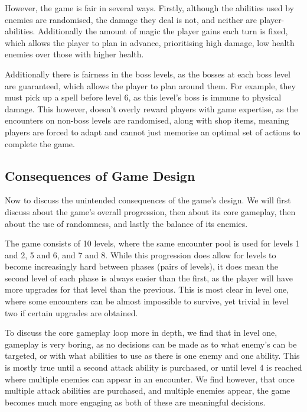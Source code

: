 However, the game is fair in several ways. Firstly, although the abilities used by enemies are randomised, the damage they deal is not, and neither are player-abilities. Additionally the amount of magic the player gains each turn is fixed, which allows the player to plan in advance, prioritising high damage, low health enemies over those with higher health. 

Additionally there is fairness in the boss levels, as the bosses at each boss level are guaranteed, which allows the player to plan around them. For example, they must pick up a spell before level 6, as this level's boss is immune to physical damage. This however, doesn't overly reward players with game expertise, as the encounters on non-boss levels are randomised, along with shop items, meaning players are forced to adapt and cannot just memorise an optimal set of actions to complete the game. 

\subsection{Consequences of Game Design}


Now to discuss the unintended consequences of the game's design. We will first discuss about the game's overall progression, then about its core gameplay, then about the use of randomness, and lastly the balance of its enemies. 

The game consists of 10 levels, where the same encounter pool is used for levels 1 and 2, 5 and 6, and 7 and 8. While this progression does allow for levels to become increasingly hard between phases (pairs of levels), it does mean the second level of each phase is always easier than the first, as the player will have more upgrades for that level than the previous. This is most clear in level one, where some encounters can be almost impossible to survive, yet trivial in level two if certain upgrades are obtained. 

To discuss the core gameplay loop more in depth, we find that in level one, gameplay is very boring, as no decisions can be made as to what enemy's can be targeted, or with what abilities to use as there is one enemy and one ability. This is mostly true until a second attack ability is purchased, or until level 4 is reached where multiple enemies can appear in an encounter. We find however, that once multiple attack abilities are purchased, and multiple enemies appear, the game becomes much more engaging as both of these are meaningful decisions. 

